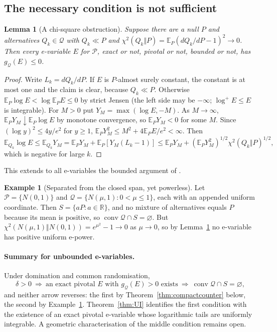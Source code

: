 \documentclass[11pt,a4paper]{article}
\newtheorem{lemma}[theorem]{Lemma}
\theoremstyle{definition}
\newtheorem{example}[theorem]{Example}
\theoremstyle{remark}
\newcommand{\PP}{\mathcal P}
\newcommand{\QQ}{\mathcal Q}
\newcommand{\EE}{\mathbb E}
\newcommand{\conv}{\operatorname{conv}}
\begin{document}
\subsection{The necessary condition is not sufficient}

\begin{lemma}[A chi-square obstruction]\label{lem:chisq}
Suppose there are a null \(P\) and alternatives \(Q_k\in\QQ\) with \(Q_k\ll P\) and \(\chi^2(Q_k\Vert P)=\EE_P(dQ_k/dP-1)^2\to0\). Then every e-variable \(E\) for \(\PP\), exact or not, pivotal or not, bounded or not, has \(g_{\QQ}(E)\le0\).
\end{lemma}
\begin{proof}
Write \(L_k=dQ_k/dP\). If \(E\) is \(P\)-almost surely constant, the constant is at most one and the claim is clear, because \(Q_k\ll P\). Otherwise \(\EE_P\log E<\log\EE_PE\le0\) by strict Jensen (the left side may be \(-\infty\); \(\log^+E\le E\) is integrable). For \(M>0\) put \(Y_M=\max(\log E,-M)\). As \(M\to\infty\), \(\EE_PY_M\downarrow\EE_P\log E\) by monotone convergence, so \(\EE_PY_M<0\) for some \(M\). Since \((\log y)^2\le4y/e^2\) for \(y\ge1\), \(\EE_PY_M^2\le M^2+4\EE_PE/e^2<\infty\). Then
\[
 \EE_{Q_k}\log E\le\EE_{Q_k}Y_M=\EE_PY_M+\EE_P[Y_M(L_k-1)]\le\EE_PY_M+(\EE_PY_M^2)^{1/2}\chi^2(Q_k\Vert P)^{1/2},
\]
which is negative for large \(k\).
\end{proof}

This extends to all e-variables the bounded argument of \cite[Example~A.4 of arXiv:2305.16539v4]{ZRW}.

\begin{example}[Separated from the closed span, yet powerless]\label{ex:gauss}
Let \(\PP=\{N(0,1)\}\) and \(\QQ=\{N(\mu,1):0<\mu\le1\}\), each with an appended uniform coordinate. Then \(S=\{aP:a\in\mathbb R\}\), and no mixture of alternatives equals \(P\) because its mean is positive, so \(\conv\QQ\cap S=\varnothing\). But \(\chi^2(N(\mu,1)\Vert N(0,1))=e^{\mu^2}-1\to0\) as \(\mu\to0\), so by Lemma~\ref{lem:chisq} no e-variable has positive uniform e-power.
\end{example}

\paragraph{Summary for unbounded e-variables.} Under domination and common randomisation,
\[
 \delta>0\ \Longrightarrow\ \text{an exact pivotal \(E\) with } g_{\QQ}(E)>0 \text{ exists}\ \Longrightarrow\ \conv\QQ\cap S=\varnothing ,
\]
and neither arrow reverses: the first by Theorem~\ref{thm:compactcounter} below, the second by Example~\ref{ex:gauss}. Theorem~\ref{thm:UI} identifies the first condition with the existence of an exact pivotal e-variable whose logarithmic tails are uniformly integrable. A geometric characterisation of the middle condition remains open.
\end{document}
